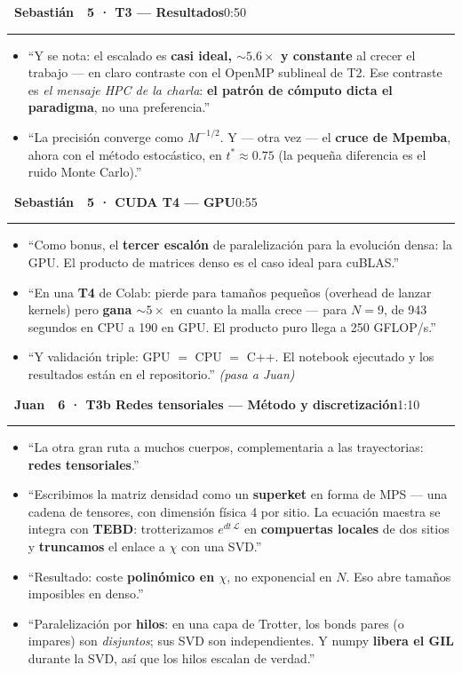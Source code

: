 \documentclass[11pt,a4paper]{article}
\newcommand{\Jb}{\colorbox{juan}{\color{white}\bfseries\footnotesize~Juan~}}
\newcommand{\Sb}{\colorbox{seb}{\color{white}\bfseries\footnotesize~Sebastián~}}
\newcommand{\cs}[1]{\textcolor{seb}{\textbf{#1}}}
\newcommand{\blk}[3]{%
  \par\medskip\noindent #1\ \textbf{#2}\hfill\textcolor{soft}{\small #3}\par
  \vspace{-4pt}\textcolor{soft!40}{\rule{\linewidth}{0.4pt}}\par\vspace{-2pt}}
\begin{document}
\blk{\Sb}{5 · T3 --- Resultados}{0:50}
\begin{itemize}
  \item ``Y se nota: el escalado es \textbf{casi ideal, $\sim5.6\times$ y constante}
    al crecer el trabajo --- en claro contraste con el OpenMP sublineal de T2. Ese
    contraste es \emph{el mensaje HPC de la charla}: \textbf{el patrón de cómputo dicta
    el paradigma}, no una preferencia.''
  \item ``La precisión converge como $M^{-1/2}$. Y --- otra vez --- el \textbf{cruce de
    Mpemba}, ahora con el método estocástico, en \cs{$t^*\approx0.75$} (la pequeña
    diferencia es el ruido Monte Carlo).''
\end{itemize}

\blk{\Sb}{5 · CUDA T4 --- GPU}{0:55}
\begin{itemize}
  \item ``Como bonus, el \textbf{tercer escalón} de paralelización para la evolución
    densa: la GPU. El producto de matrices denso es el caso ideal para cuBLAS.''
  \item ``En una \textbf{T4} de Colab: pierde para tamaños pequeños (overhead de lanzar
    kernels) pero \textbf{gana $\sim5\times$} en cuanto la malla crece --- para $N=9$,
    de 943 segundos en CPU a 190 en GPU. El producto puro llega a 250 GFLOP/s.''
  \item ``Y validación triple: GPU $=$ CPU $=$ C++. El notebook ejecutado y los
    resultados están en el repositorio.'' \emph{(pasa a Juan)}
\end{itemize}

\blk{\Jb}{6 · T3b Redes tensoriales --- Método y discretización}{1:10}
\begin{itemize}
  \item ``La otra gran ruta a muchos cuerpos, complementaria a las trayectorias:
    \textbf{redes tensoriales}.''
  \item ``Escribimos la matriz densidad como un \textbf{superket} en forma de MPS ---
    una cadena de tensores, con dimensión física 4 por sitio. La ecuación maestra se
    integra con \textbf{TEBD}: trotterizamos $e^{dt\,\mathcal{L}}$ en \textbf{compuertas
    locales} de dos sitios y \textbf{truncamos} el enlace a $\chi$ con una SVD.''
  \item ``Resultado: coste \textbf{polinómico en $\chi$}, no exponencial en $N$. Eso
    abre tamaños imposibles en denso.''
  \item ``Paralelización por \textbf{hilos}: en una capa de Trotter, los bonds pares
    (o impares) son \emph{disjuntos}; sus SVD son independientes. Y numpy
    \textbf{libera el GIL} durante la SVD, así que los hilos escalan de verdad.''
\end{itemize}
\end{document}
